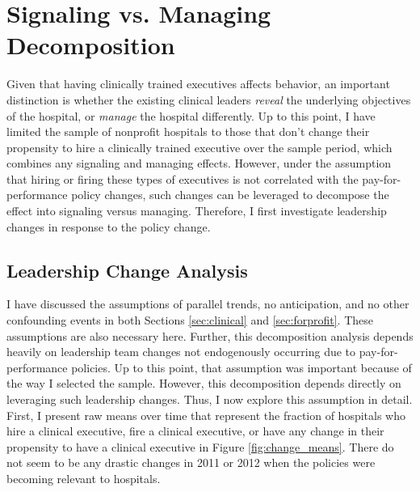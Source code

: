 \documentclass[12pt]{article}
\begin{document}
\begin{figure}[ht!]
\begin{subfigure}[b]{0.45\textwidth}
         \label{fig:mort_synth_plotc}
     \end{subfigure}
        \label{fig:mort_synth_plot}
    \end{figure}
    

\section{Signaling vs. Managing Decomposition}\label{sec:sig_man}

    Given that having clinically trained executives affects behavior, an important distinction is whether the existing clinical leaders \textit{reveal} the underlying objectives of the hospital, or \textit{manage} the hospital differently. Up to this point, I have limited the sample of nonprofit hospitals to those that don't change their propensity to hire a clinically trained executive over the sample period, which combines any signaling and managing effects. However, under the assumption that hiring or firing these types of executives is not correlated with the pay-for-performance policy changes, such changes can be leveraged to decompose the effect into signaling versus managing. Therefore, I first investigate leadership changes in response to the policy change. 

    \subsection{Leadership Change Analysis} \label{sec:changes}

    I have discussed the assumptions of parallel trends, no anticipation, and no other confounding events in both Sections \ref{sec:clinical} and \ref{sec:forprofit}. These assumptions are also necessary here. Further, this decomposition analysis depends heavily on leadership team changes not endogenously occurring due to pay-for-performance policies. Up to this point, that assumption was important because of the way I selected the sample. However, this decomposition depends directly on leveraging such leadership changes. Thus, I now explore this assumption in detail. First, I present raw means over time that represent the fraction of hospitals who hire a clinical executive, fire a clinical executive, or have any change in their propensity to have a clinical executive in Figure \ref{fig:change_means}. There do not seem to be any drastic changes in 2011 or 2012 when the policies were becoming relevant to hospitals. 
\end{document}
